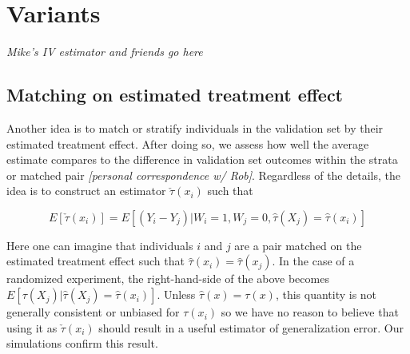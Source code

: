 \section{Variants}
\label{variants}

\emph{Mike's IV estimator and friends go here}

\subsection{Matching on estimated treatment effect}

\label{te-match}

Another idea is to match or stratify individuals in the validation set by their estimated treatment effect. After doing so, we assess how well the average estimate compares to the difference in validation set outcomes within the strata or matched pair \emph{[personal correspondence w/ Rob]}. Regardless of the details, the idea is to construct an estimator $\check\tau(x_i)$ such that 

\[
E[\check\tau(x_i)] = E[(Y_i - Y_j) | W_i = 1, W_j=0, \hat\tau(X_j) = \hat\tau(x_i)]
\]

Here one can imagine that individuals $i$ and $j$ are a pair matched on the estimated treatment effect such that $\hat\tau(x_i) = \hat\tau(x_j)$. In the case of a randomized experiment, the right-hand-side of the above becomes $E[ \tau(X_j) | \hat\tau(X_j) = \hat\tau(x_i)]$. Unless $\hat\tau(x) = \tau(x)$, this quantity is not generally consistent or unbiased for $\tau(x_i)$ so we have no reason to believe that using it as $\check \tau(x_i)$ should result in a useful estimator of generalization error. Our simulations confirm this result.


